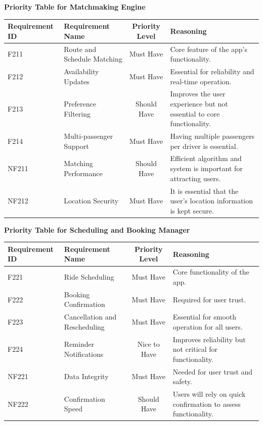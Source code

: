 \documentclass[12pt,letterpaper]{article}
\begin{document}

\noindent \textbf{Priority Table for Matchmaking Engine}
\vspace{0.5em}
\begin{center}
\small
\begin{tabularx}{\textwidth}{|l|X|c|Y|}
\hline
\textbf{Requirement ID} & \textbf{Requirement Name} & \textbf{Priority Level} & \textbf{Reasoning} \\ \hline
F211 & Route and Schedule Matching & Must Have & Core feature of the app’s functionality. \\ \hline
F212 & Availability Updates & Must Have & Essential for reliability and real-time operation. \\ \hline
F213 & Preference Filtering & Should Have & Improves the user experience but not essential to core functionality. \\ \hline
F214 & Multi-passenger Support & Must Have & Having multiple passengers per driver is essential. \\ \hline
NF211 & Matching Performance & Should Have & Efficient algorithm and system is important for attracting users. \\ \hline
NF212 & Location Security & Must Have & It is essential that the user’s location information is kept secure. \\ \hline
\end{tabularx}
\end{center}
\vspace{2em}

\noindent \textbf{Priority Table for Scheduling and Booking Manager}
\vspace{0.5em}
  \begin{center}
  \small
  \begin{tabularx}{\textwidth}{|l|X|c|Y|}
  \hline
  \textbf{Requirement ID} & \textbf{Requirement Name} & \textbf{Priority Level} & \textbf{Reasoning} \\ \hline
  F221 & Ride Scheduling & Must Have & Core functionality of the app. \\ \hline
  F222 & Booking Confirmation & Must Have & Required for user trust. \\ \hline
  F223 & Cancellation and Rescheduling & Must Have & Essential for smooth operation for all users. \\ \hline
  F224 & Reminder Notifications & Nice to Have & Improves reliability but not critical for functionality. \\ \hline
  NF221 & Data Integrity & Must Have & Needed for user trust and safety. \\ \hline
  NF222 & Confirmation Speed & Should Have & Users will rely on quick confirmation to assess functionality. \\ \hline
  \end{tabularx}
\end{center}
  \vspace{2em}
\end{document}
